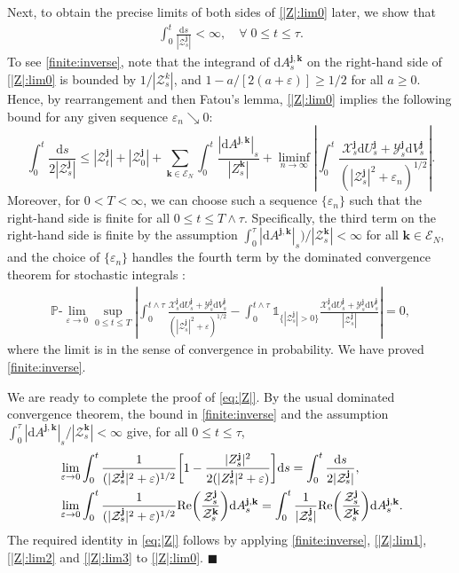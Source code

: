 \documentclass[12pt, twoside]{article}
\numberwithin{figure}{section}
\renewcommand{\Re}{{\rm Re}}
\newcommand{\1}{\mathds 1}
\newcommand{\vep}{{\varepsilon}}
\renewcommand{\P}{{\mathbb P}}
\newcommand{\mc}{\mathcal}
\renewcommand{\d}{{\mathrm d}}
\newcommand{\2}{{\mathbf 1}}
\renewenvironment{proof}[1][\proofname]{\noindent {\bfseries #1.}\;}{\hfill\ensuremath{\blacksquare}\\}
\newcommand{\bj}{\mathbf j}
\newcommand{\bk}{\mathbf k}
\begin{document}
\begin{proof}
Next, to obtain the precise limits of both sides of \eqref{|Z|:lim0} later, we show that
\begin{align}\label{finite:inverse}
\int_0^t \frac{\d s}{|\mc Z^\bj_s|}<\infty,\quad \forall\;0\leq t\leq \tau.
\end{align}
To see \eqref{finite:inverse}, note that the integrand of $\d A^{\bj,\bk}_s$ on the right-hand side of \eqref{|Z|:lim0} is bounded by $1/|\mathcal Z^k_s|$, and $1-a/[2(a+\vep)]\geq 1/2$ for all $a\geq 0$. Hence, by rearrangement and then Fatou's lemma, \eqref{|Z|:lim0} implies the following bound for any given sequence $\vep_n\searrow 0$:
\[
\int_0^t\frac{\d s}{2|\mathcal Z^\bj_s|}\leq |\mathcal Z^\bj_t|+|\mathcal Z^\bj_0|
+\sum_{\bk\in \mathcal E_N}\int_0^t\frac{|\d A^{\bj,\bk}|_s}{|Z^\bk_s|} +\liminf_{n\to\infty}\left|\int_0^t \frac{\mathcal X^\bj_s\d U^\bj_s+\mathcal Y^\bj_s\d V^\bj_s}{(|\mathcal Z^\bj_s|^2+\vep_n)^{1/2}}\right|.
\]
Moreover, for $0<T<\infty$, we can choose such a sequence $\{\vep_n\}$ such that 
the right-hand side is finite for all $0\leq t\leq T\wedge \tau$. Specifically, the third term on the right-hand side is finite by the assumption $\int_0^\tau  |\d A^{\bj,\bk}|_s)/|\mathcal Z^\bk_s|<\infty$ for all $\bk\in \mc E_N$, and the choice of $\{\vep_n\}$ handles the fourth term by the dominated convergence theorem for stochastic integrals \cite[Theorem~32, p.176]{Protter}:
\begin{align}\label{|Z|:lim1}
\P\mbox{-}\lim_{\vep\to 0}\sup_{0\leq t\leq T}\left|\int_0^{t\wedge \tau} \frac{\mathcal X^\bj_s\d U^\bj_s+\mathcal Y^\bj_s\d V^\bj_s}{(|\mathcal Z^\bj_s|^2+\vep)^{1/2}}-\int_0^{t\wedge \tau}\1_{\{|\mc Z^\bj_s|>0\}} \frac{\mathcal X^\bj_s\d U^\bj_s+\mathcal Y^\bj_s\d V^\bj_s}{|\mathcal Z^\bj_s|}\right|=0,
\end{align}
where the limit is in the sense of convergence in probability. We have proved \eqref{finite:inverse}.

We are ready to complete the proof of \eqref{eq:|Z|}.
By the usual dominated convergence theorem, the bound in \eqref{finite:inverse} and the assumption $\int_0^\tau |\d A^{\bj,\bk}|_s/|\mc Z^\bk_s|<\infty$
 give, for all $0\leq t\leq \tau$, 
\begin{align}
&\lim_{\vep\to 0}\int_0^t\frac{1}{(|\mathcal Z^\bj_s|^2+\vep)^{1/2}}\biggl[1-\frac{|Z^\bj_s|^2}{2(|Z_s^\bj|^2+\vep)}\biggr]\d s=\int_0^t \frac{\d s}{2|\mathcal Z^\bj_s|},\label{|Z|:lim2}\\
&\lim_{\vep\to 0}\int_0^t\frac{1}{(|\mathcal Z^\bj_s|^2+\vep)^{1/2}}\Re\biggl(\frac{\mathcal Z^\bj_s}{\mathcal Z^\bk_s}\biggr)\d A^{\bj,\bk}_s=\int_0^t\frac{1}{|\mathcal Z^\bj_s|}\Re\biggl(\frac{\mathcal Z^\bj_s}{\mathcal Z^\bk_s}\biggr)\d A^{\bj,\bk}_s.\label{|Z|:lim3}
\end{align}
The required identity in \eqref{eq:|Z|} follows by applying \eqref{finite:inverse}, \eqref{|Z|:lim1}, \eqref{|Z|:lim2} and \eqref{|Z|:lim3} to \eqref{|Z|:lim0}.
\end{proof}
\end{document}
